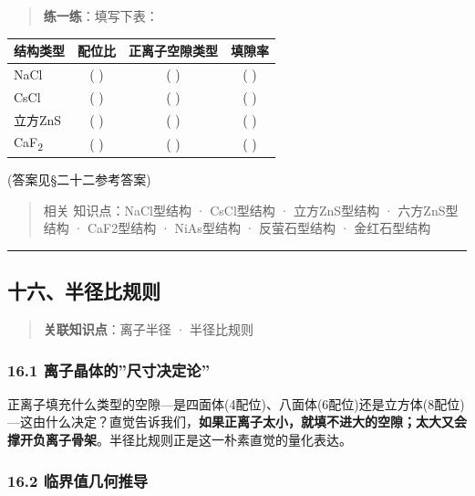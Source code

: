 \begin{quote}
\textbf{练一练}：填写下表：
\end{quote}

{\def\LTcaptype{none} %
\begin{longtable}[]{@{}lccc@{}}
\toprule\noalign{}
结构类型 & 配位比 & 正离子空隙类型 & 填隙率 \\
\midrule\noalign{}
\endhead
\bottomrule\noalign{}
\endlastfoot
NaCl & ( ) & ( ) & ( ) \\
CsCl & ( ) & ( ) & ( ) \\
立方ZnS & ( ) & ( ) & ( ) \\
CaF\textsubscript{2} & ( ) & ( ) & ( ) \\
\end{longtable}
}

(答案见§二十二参考答案)

\begin{quote}
相关 知识点：NaCl型结构 · CsCl型结构 · 立方ZnS型结构 · 六方ZnS型结构 · CaF2型结构 · NiAs型结构 · 反萤石型结构 · 金红石型结构
\end{quote}

\begin{center}\rule{0.5\linewidth}{0.5pt}\end{center}

\subsection{十六、半径比规则}\label{ux5341ux516dux534aux5f84ux6bd4ux89c4ux5219}

\begin{quote}
\textbf{关联知识点}：离子半径 · 半径比规则
\end{quote}

\subsubsection{16.1 离子晶体的''尺寸决定论''}\label{ux79bbux5b50ux6676ux4f53ux7684ux5c3aux5bf8ux51b3ux5b9aux8bba}

正离子填充什么类型的空隙---是四面体(4配位)、八面体(6配位)还是立方体(8配位)---这由什么决定？直觉告诉我们，\textbf{如果正离子太小，就填不进大的空隙；太大又会撑开负离子骨架}。半径比规则正是这一朴素直觉的量化表达。

\subsubsection{16.2 临界值几何推导}\label{ux4e34ux754cux503cux51e0ux4f55ux63a8ux5bfc}

